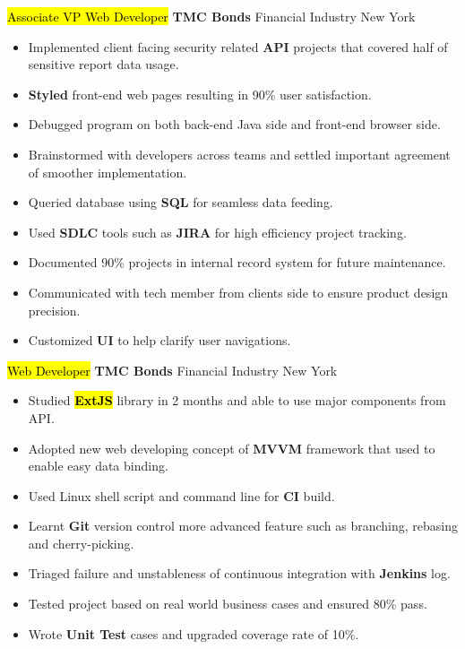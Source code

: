 \documentclass[11pt,a4paper,sans]{moderncv}   %
\begin{document}
{\hl{Associate VP Web Developer}}
{\textbf{TMC Bonds}}
{Financial Industry}
{New York}
{
  \begin{itemize}
    \item{Implemented client facing security related \textbf{API} projects that covered half of sensitive report data usage.}
	  \item{\textbf{Styled} front-end web pages resulting in 90\% user satisfaction.}
	  \item{Debugged program on both back-end Java side and front-end browser side.}
	  \item{Brainstormed with developers across teams and settled important agreement of smoother implementation.}
	  \item{Queried database using \textbf{SQL} for seamless data feeding.}
	  \item{Used \textbf{SDLC} tools such as \textbf{JIRA} for high efficiency project tracking.}
	  \item{Documented 90\% projects in internal record system for future maintenance.}
	  \item{Communicated with tech member from clients side to ensure product design precision.}
	  \item{Customized \textbf{UI} to help clarify user navigations.}
	\end{itemize}
}

{\hl{Web Developer}}
{\textbf{TMC Bonds}}
{Financial Industry}
{New York}
{
	\begin{itemize}
    \item{Studied \hl{\textbf{ExtJS}} library in 2 months and able to use major components from API.}
    \item{Adopted new web developing concept of \textbf{MVVM} framework that used to enable easy data binding.}
    \item{Used Linux shell script and command line for \textbf{CI} build.}
    \item{Learnt \textbf{Git} version control more advanced feature such as branching, rebasing and cherry-picking.}
    \item{Triaged failure and unstableness of continuous integration with \textbf{Jenkins} log.}
    \item{Tested project based on real world business cases and ensured 80\% pass.}
    \item{Wrote \textbf{Unit Test} cases and upgraded coverage rate of 10\%.}
	\end{itemize}
}
\end{document}
